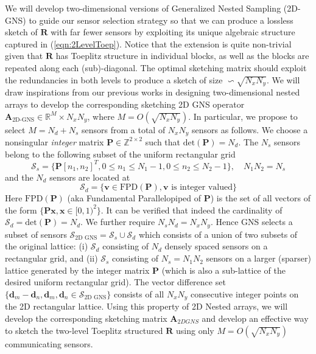 \begin{enumerate}
\noindent We will develop two-dimensional versions of Generalized Nested Sampling (2D-GNS) to guide our sensor selection strategy so that we can produce a lossless sketch of $\mathbf{R}$ with far fewer sensors by exploiting its unique algebraic structure captured in (\ref{eqn:2LevelToep}). Notice that the extension is quite non-trivial given that $\mathbf{R}$ has Toeplitz structure in individual blocks, as well as the blocks are repeated along each (sub)-diagonal. The optimal sketching matrix should exploit the redundancies in both levels to produce a sketch of size $\backsim \sqrt{N_xN_y}$. We will draw inspirations from our previous works in designing two-dimensional nested arrays to develop the corresponding sketching 2D GNS operator $\mathbf{A}_{\text{2D-GNS}} \in \mathbb{R}^M \times {N_xN_y}$, where $M = O(\sqrt{N_xN_y})$. In particular, we propose to select $M=N_d+N_s$ sensors from a total of $N_xN_y$ sensors as follows. We choose a nonsingular {\em integer} matrix $\mathbf{P}\in \mathbb{Z}^{2\times 2}$ such that $\text{det}(\mathbf{P})=N_d$. The $N_s$ sensors belong to the following subset  of the uniform rectangular grid \[ \mathcal{S}_{s} = \{\mathbf{P}[n_1,n_2]^{T}, 0\leq n_1\leq N_1-1, 0\leq n_2\leq N_2-1 \} ,\quad N_1N_2 = N_s \]
and the $N_d$ sensors are located at \[ \mathcal{S}_d = \{ \mathbf{v} \in \text{FPD}(\mathbf{P}), \mathbf{v} \text{ is integer valued} \} \] 
Here $\text{FPD}(\mathbf{P})$ (aka Fundamental Parallelopiped of $\mathbf{P}$)  is the set of all vectors of the form $\{\mathbf{Px}, \mathbf{x}\in[0,1)^2 \}$. It can be verified that indeed the cardinality of $\mathcal{S}_d = \text{det}(\mathbf{P}) = N_d$. We further require $N_sN_d = N_xN_y$. Hence GNS selects a subset of sensors $\mathcal{S}_{\text{2D GNS}} = \mathcal{S}_s\cup \mathcal{S}_d$ which consists of a union of two subsets of the original lattice: (i) $\mathcal{S}_d$ consisting of $N_d$ densely spaced sensors on a rectangular grid, and (ii) $\mathcal{S}_s$ consisting of $N_s = N_1N_2$ sensors on a larger (sparser) lattice generated by the integer matrix $\mathbf{P}$ (which is also a sub-lattice of the desired uniform rectangular grid). The vector difference set $\{\mathbf{d}_m-\mathbf{d}_n, \mathbf{d}_m,\mathbf{d}_n\in \mathcal{S}_{\text{2D GNS}}\}$ consists of all $N_xN_y$ consecutive integer points on the 2D rectangular lattice. Using this property of 2D Nested arrays, we will develop the corresponding sketching matrix $\mathbf{A}_{2D GNS}$ and develop an effective way to sketch the two-level Toeplitz structured $\mathbf{R}$ using only $M = O(\sqrt{N_xN_y})$ communicating sensors. 


\end{enumerate}
